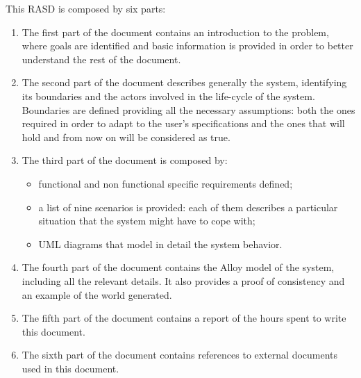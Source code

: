This RASD is composed by six parts:
\begin{enumerate}
\item The first part of the document contains an introduction to the problem, where goals are identified and basic information is provided in order to better understand the rest of the document.
\item The second part of the document describes generally the system, identifying its boundaries and the actors involved in the life-cycle of the system. Boundaries are defined providing all the necessary assumptions: both the ones required in order to adapt to the user's specifications and the ones that will hold and from now on will be considered as true.
\item The third part of the document is composed by:
	\begin{itemize}
	\item functional and non functional specific requirements defined;
	\item a list of nine scenarios is provided: each of them describes a particular situation that the system might have to cope with;
	\item UML diagrams that model in detail the system behavior.
	\end{itemize}
\item The fourth part of the document contains the Alloy model of the system, including all the relevant 
details. It also provides a proof of consistency and an example of the world generated.
\item The fifth part of the document contains a report of the hours spent to write this document.
\item The sixth part of the document contains references to external documents used in this document.
\end{enumerate}
